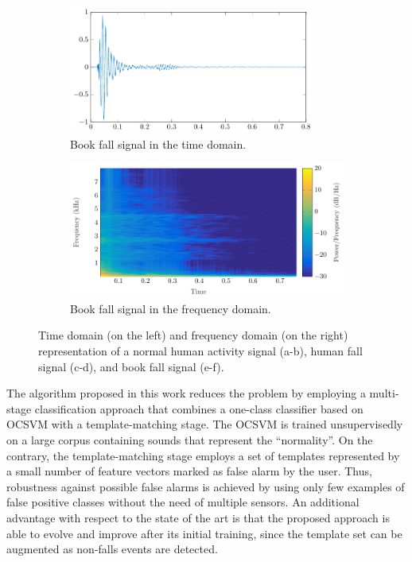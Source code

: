 \begin{figure}[htbp!]
	\begin{subfigure}[ht]{0.5\columnwidth}
		\centering
		\includegraphics[width=0.9\textwidth]{img/cin/book_time_.pdf}
		\caption{Book fall signal in the time domain.}\label{fig:time_bf}
	\end{subfigure}%
	\begin{subfigure}[ht]{0.5\columnwidth}
		\centering
		\includegraphics[width=\textwidth]{img/cin/book_freq_.pdf}
		\caption{Book fall signal in the frequency domain.}\label{fig:spec_bf}
	\end{subfigure}
	\caption{Time domain (on the left) and frequency domain (on the right) representation of a normal human activity signal (a-b), human fall signal (c-d), and book fall signal (e-f).}\label{fig:waveforms}
\end{figure}

The algorithm proposed in this work reduces the problem by employing a multi-stage classification approach that combines a one-class classifier based on OCSVM with a template-matching stage. The OCSVM is trained unsupervisedly on a large corpus containing sounds that represent the ``normality''. On the contrary, the template-matching stage employs a set of templates represented by a small number of feature vectors marked as false alarm by the user. Thus, robustness against possible false alarms is achieved by using only few examples of false positive classes without the need of multiple sensors. An additional advantage with respect to the state of the art is that the proposed approach is able to evolve and improve after its initial training, since the template set can be augmented as non-falls events are detected.

